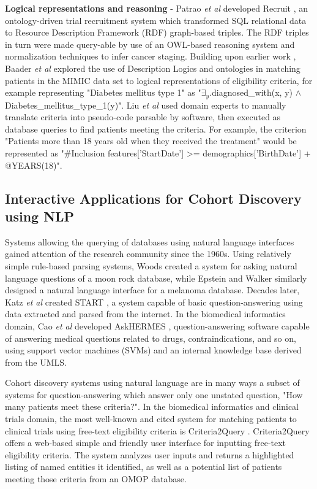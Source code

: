 \documentclass[../main.tex]{subfiles}
\begin{document}
\textbf{Logical representations and reasoning} - Patrao \textit{et al} developed Recruit \cite{patrao2015recruit}, an ontology-driven trial recruitment system which transformed SQL relational data to Resource Description Framework (RDF) graph-based triples. The RDF triples in turn were made query-able by use of an OWL-based reasoning system \cite{owl} and normalization techniques to infer cancer staging. Building upon earlier work \cite{patel2007matching, tu2009ergo, huang2013semanticct}, Baader \textit{et al} \cite{baader2018patient} explored the use of Description Logics and ontologies in matching patients in the MIMIC data set to logical representations of eligibility criteria, for example representing "Diabetes mellitus type 1" as "$\exists_y$.diagnosed\_with(x, y) $\wedge$ Diabetes\_mellitus\_type\_1(y)". Liu \textit{et al} \cite{liu2021evaluating} used domain experts to manually translate criteria into pseudo-code parsable by software, then executed as database queries to find patients meeting the criteria. For example, the criterion "Patients more than 18 years old when they received the treatment" would be represented as "\#Inclusion features['StartDate'] >= demographics['BirthDate'] + @YEARS(18)". 

\subsection{Interactive Applications for Cohort Discovery using NLP}

Systems allowing the querying of databases using natural language interfaces gained attention of the research community since the 1960s. Using relatively simple rule-based parsing systems, Woods \cite{woods1973progress} created a system for asking natural language questions of a moon rock database, while Epstein and Walker \cite{epstein1978natural} similarly designed a natural language interface for a melanoma database. Decades later, Katz \textit{et al} created START \cite{katz1999integrating}, a system capable of basic question-answering using data extracted and parsed from the internet. In the biomedical informatics domain, Cao \textit{et al} developed AskHERMES \cite{cao2011askhermes}, question-answering software capable of answering medical questions related to drugs, contraindications, and so on, using support vector machines (SVMs) and an internal knowledge base derived from the UMLS.

Cohort discovery systems using natural language are in many ways a subset of systems for question-answering which answer only one unstated question, "How many patients meet these criteria?". In the biomedical informatics and clinical trials domain, the most well-known and cited system for matching patients to clinical trials using free-text eligibility criteria is Criteria2Query \cite{yuan2019criteria2query, fang2022combining}. Criteria2Query offers a web-based simple and friendly user interface for inputting free-text eligibility criteria. The system analyzes user inputs and returns a highlighted listing of named entities it identified, as well as a potential list of patients meeting those criteria from an OMOP database.
\end{document}
